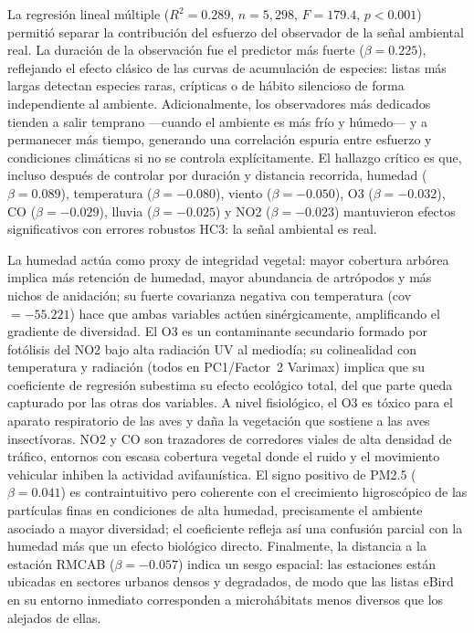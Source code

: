 \documentclass[9pt,letterpaper]{article}
\begin{document}
La regresión lineal múltiple ($R^2=0.289$, $n=5{,}298$, $F=179.4$, $p<0.001$) permitió separar la contribución del esfuerzo del observador de la señal ambiental real. La duración de la observación fue el predictor más fuerte ($\beta=0.225$), reflejando el efecto clásico de las curvas de acumulación de especies: listas más largas detectan especies raras, crípticas o de hábito silencioso de forma independiente al ambiente. Adicionalmente, los observadores más dedicados tienden a salir temprano ---cuando el ambiente es más frío y húmedo--- y a permanecer más tiempo, generando una correlación espuria entre esfuerzo y condiciones climáticas si no se controla explícitamente. El hallazgo crítico es que, incluso después de controlar por duración y distancia recorrida, humedad ($\beta=0.089$), temperatura ($\beta=-0.080$), viento ($\beta=-0.050$), O3 ($\beta=-0.032$), CO ($\beta=-0.029$), lluvia ($\beta=-0.025$) y NO2 ($\beta=-0.023$) mantuvieron efectos significativos con errores robustos HC3: la señal ambiental es real.

La humedad actúa como proxy de integridad vegetal: mayor cobertura arbórea implica más retención de humedad, mayor abundancia de artrópodos y más nichos de anidación; su fuerte covarianza negativa con temperatura (cov$=-55.221$) hace que ambas variables actúen sinérgicamente, amplificando el gradiente de diversidad. El O3 es un contaminante secundario formado por fotólisis del NO2 bajo alta radiación UV al mediodía; su colinealidad con temperatura y radiación (todos en PC1/Factor~2 Varimax) implica que su coeficiente de regresión subestima su efecto ecológico total, del que parte queda capturado por las otras dos variables. A nivel fisiológico, el O3 es tóxico para el aparato respiratorio de las aves y daña la vegetación que sostiene a las aves insectívoras. NO2 y CO son trazadores de corredores viales de alta densidad de tráfico, entornos con escasa cobertura vegetal donde el ruido y el movimiento vehicular inhiben la actividad avifaunística. El signo positivo de PM2.5 ($\beta=0.041$) es contraintuitivo pero coherente con el crecimiento higroscópico de las partículas finas en condiciones de alta humedad, precisamente el ambiente asociado a mayor diversidad; el coeficiente refleja así una confusión parcial con la humedad más que un efecto biológico directo. Finalmente, la distancia a la estación RMCAB ($\beta=-0.057$) indica un sesgo espacial: las estaciones están ubicadas en sectores urbanos densos y degradados, de modo que las listas eBird en su entorno inmediato corresponden a microhábitats menos diversos que los alejados de ellas.
\end{document}

